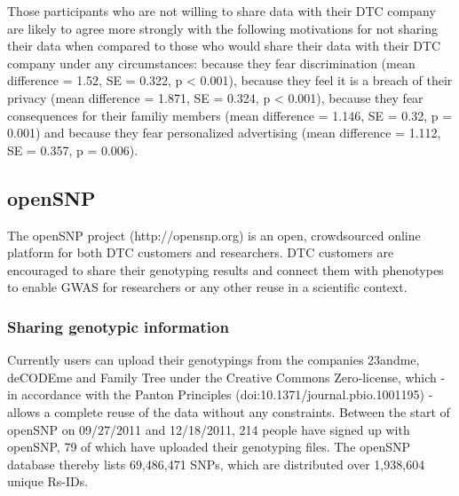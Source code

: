 \documentclass[10pt]{article}
\begin{document}
Those participants who are not willing to share data with their DTC company are likely to agree more strongly with the following motivations for not sharing their data when compared to those who would share their data with their DTC company under any circumstances: because they fear discrimination (mean difference = 1.52, SE = 0.322, p < 0.001), because they feel it is a breach of their privacy (mean difference = 1.871, SE = 0.324, p < 0.001), because they fear consequences for their familiy members (mean difference = 1.146, SE = 0.32, p = 0.001) and because they fear personalized advertising (mean difference =  1.112, SE = 0.357, p = 0.006). 

\subsection*{openSNP}

The openSNP project (http://opensnp.org) is an open, crowdsourced online platform for both DTC customers and researchers. DTC customers are encouraged to share their genotyping results and connect them with phenotypes to enable GWAS for researchers or any other reuse in a scientific context. 

\subsubsection*{Sharing genotypic information}
Currently users can upload their genotypings from the companies 23andme, deCODEme and Family Tree under the Creative Commons Zero-license, which - in accordance with the Panton Principles (doi:10.1371/journal.pbio.1001195) - allows a complete reuse of the data without any constraints.
Between the start of openSNP on 09/27/2011 and 12/18/2011, 214 people have signed up with openSNP, 79 of which have uploaded their genotyping files. The openSNP database thereby lists 69,486,471 SNPs, which are distributed over 1,938,604 unique Rs-IDs.
\end{document}

